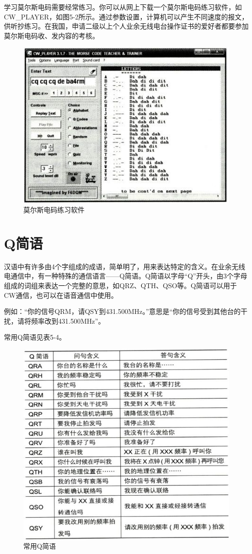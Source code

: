 \documentclass[12pt,UTF8]{ctexbook}
\begin{document}
学习莫尔斯电码需要经常练习。你可以从网上下载一个莫尔斯电码练习软件，如CW\_PLAYER，如图5-2所示。通过参数设置，计算机可以产生不同速度的报文，供听抄练习。在我国，申请二级以上个人业余无线电台操作证书的爱好者都要参加莫尔斯电码收、发内容的考核。

\begin{figure}[htbp]
	\centering
	\includegraphics[width=0.7\linewidth]{63}
	\caption{莫尔斯电码练习软件}
	\label{fig:1}
\end{figure}

\section{Q简语}

汉语中有许多由4个字组成的成语，简单明了，用来表达特定的含义。在业余无线电通信中，有一种特殊的通信语言——Q简语。Q简语以字母“Q”开头，由3个字母组成的词组来表达一个完整的意思，如QRZ、QTH、QSO等。Q简语可以用于CW通信，也可以在语音通信中使用。

例如：“你的信号QRM，请QSY到431.500MHz。”意思是“你的信号受到其他台的干扰，请将频率改到431.500MHz”。

常用Q简语见表5-4。

\begin{figure}[htbp]
	\centering
	\includegraphics[width=0.7\linewidth]{64}
	\caption{常用Q简语}
	\label{fig:1}
\end{figure}
\end{document}
